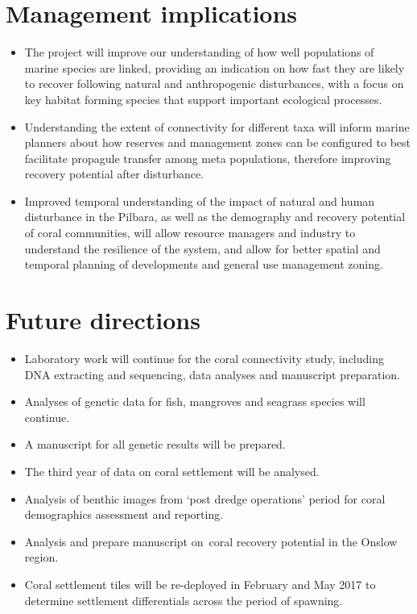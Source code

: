 \documentclass[version=last,
    paper=a4, %
    10pt, %
    usenames,
    dvipsnames,
    oneside, %
    headings=openany, %
    DIV=15 %
]{scrbook}
\begin{document}
\section*{Management implications}
\begin{itemize}
\itemsep1pt\parskip0pt
\item
  The project will improve our understanding of how well populations of
  marine species are linked, providing an indication on how fast they
  are likely to recover following natural and anthropogenic
  disturbances, with a focus on key habitat forming species that support
  important ecological processes.
\item
  Understanding the extent of connectivity for different taxa will
  inform marine planners about how reserves and management zones can be
  configured to best facilitate propagule transfer among meta
  populations, therefore improving recovery potential after disturbance.
\item
  Improved temporal understanding of the impact of natural and human
  disturbance in the Pilbara, as well as the demography and recovery
  potential of coral communities, will allow resource managers and
  industry to understand the resilience of the system, and allow for
  better spatial and temporal planning of developments and general use
  management zoning.
\end{itemize}



\section*{Future directions}
\begin{itemize}
\itemsep1pt\parskip0pt
\item
  Laboratory work will continue for the coral connectivity study,
  including DNA extracting and sequencing, data analyses and manuscript
  preparation.
\item
  Analyses of genetic data for fish, mangroves and seagrass species will
  continue.
\item
  A manuscript for all genetic results will be prepared.
\item
  The third year of data on coral settlement will be analysed.
\item
  Analysis of benthic images from `post dredge operations' period for
  coral demographics assessment and reporting.
\item
  Analysis and prepare manuscript on~coral recovery potential in the
  Onslow region.
\item
  Coral settlement tiles will be re-deployed in February and May 2017 to
  determine settlement differentials across the period of spawning.
\end{itemize}



\end{document}
